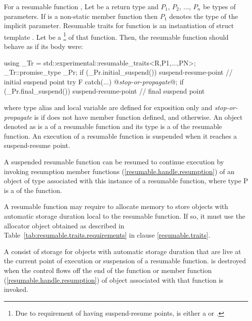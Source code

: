 \pnum
For a resumable function , Let  be a return type and $P_1$, $P_2$, ..., $P_n$
be types of parameters. If  is a non-static member function then $P_1$ denotes the type of the implicit  parameter. 
Resumable traits for function  is an instantiation of
struct template .
Let  be a 
\footnote{
Due to requirement of having suspend-resume points,
 is either a
 or 
.
}
of that function. Then, the resumable function 
should behave as if its body were:
\begin{codeblock}
  {
     using _Tr = std::experimental::resumable_traits<R,P1,...,PN>;
     _Tr::promise_type _Pr;
     if (_Pr.initial_suspend()) {
       suspend-resume-point // initial suspend point
     }
     try { F }
     catch(...) {
       @\textit{stop-or-propagate}@;
     }
     if (_Pr.final_suspend()) {
       suspend-resume-point // final suspend point
     }
  }
\end{codeblock}
where type alias  and local variable  are 
defined for
exposition only and
\textit{stop-or-propagate} is  
if  does not have  member function defined, and  otherwise. An object denoted as  is a  of
a resumable function and its type is a 
of the resumable function.
An execution of a resumable function is suspended when it reaches a suspend-resume point.

\pnum
A suspended resumable function can be resumed
to continue execution by invoking
resumption member functions (\ref{resumable.handle.resumption}) of an object of  type
associated with this instance of a resumable function, where type P
is a  of the function. 

\pnum
A resumable function may require to allocate
memory to store objects with automatic storage duration
local to the resumable function. If so, it must
use the allocator object obtained as described in 
Table~\ref{tab:resumable.traits.requirements} in clause \ref{resumable.traits}.

\pnum
A  consist of 
storage for objects with automatic storage duration
that are live at the current point of execution or suspension of 
a resumable function.
 is destroyed when
the control flows off the end of the function or
 member function (\ref{resumable.handle.resumption}) of  object associated with that function is invoked.

